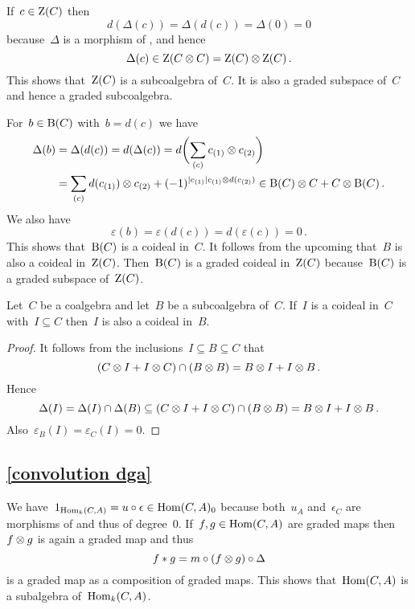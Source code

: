 \documentclass[a4paper,10pt,headings=standardclasses]{scrartcl}
\begin{document}
If~$c \in \operatorname{Z}(C)$ then
\[
  d(\Delta(c))
  =
  \Delta(d(c))
  =
  \Delta(0)
  =
  0
\]
because~$\Delta$ is a morphism of {\dgvs}, and hence
\[
  \Delta(c)
  \in
  \operatorname{Z}(C \otimes C)
  =
  \operatorname{Z}(C) \otimes \operatorname{Z}(C) \,.
\]
This shows that~$\operatorname{Z}(C)$ is a subcoalgebra of~$C$.
It is also a graded subspace of~$C$ and hence a graded subcoalgebra.

For~$b \in \operatorname{B}(C)$ with~$b = d(c)$ we have
\begin{align*}
  \Delta(b)
  &=
  \Delta(d(c))
  =
  d(\Delta(c))
  =
  d\biggl( \sum_{(c)} c_{(1)} \otimes c_{(2)} \biggr)
  \\
  &=
  \sum_{(c)}
  d(c_{(1)}) \otimes c_{(2)}
  +
  (-1)^{\lvert c_{(1)}\rvert c_{(1)} \otimes d(c_{(2)})}
  \in
  \operatorname{B}(C) \otimes C + C \otimes \operatorname{B}(C) \,.
\end{align*}
We also have
\[
  \varepsilon(b)
  =
  \varepsilon(d(c))
  =
  d(\varepsilon(c))
  =
  0 \,.
\]
This shows that~$\operatorname{B}(C)$ is a coideal in~$C$.
It follows from the upcoming  that~$B$ is also a coideal in~$\operatorname{Z}(C)$.
Then~$\operatorname{B}(C)$ is a graded coideal in~$\operatorname{Z}(C)$ because~$\operatorname{B}(C)$ is a graded subspace of~$\operatorname{Z}(C)$.

\begin{lemma}
  \label{restriction of coideals}
  Let~$C$ be a coalgebra and let~$B$ be a subcoalgebra of~$C$.
  If~$I$ is a coideal in~$C$ with~$I \subseteq C$ then~$I$ is also a coideal in~$B$.
\end{lemma}

\begin{proof}
  It follows from the inclusions~$I \subseteq B \subseteq C$ that
  \[
    (C \otimes I + I \otimes C) \cap (B \otimes B)
    =
    B \otimes I + I \otimes B \,.
  \]
  Hence
  \[
    \Delta(I)
    =
    \Delta(I) \cap \Delta(B)
    \subseteq
    (C \otimes I + I \otimes C) \cap (B \otimes B)
    =
    B \otimes I + I \otimes B \,.
  \]
  Also~$\varepsilon_B(I) = \varepsilon_C(I) = 0$.
\end{proof}








\subsection{\cref{convolution dga}}
\label{convolution dga proof}

We have~$1_{\operatorname{Hom}_k(C,A)} = u \circ \epsilon \in \operatorname{Hom}(C,A)_0$ because both~$u_A$ and~$\epsilon_C$ are morphisms of {\dgvs} and thus of degree~$0$.
If~$f, g \in \operatorname{Hom}(C,A)$ are graded maps then~$f \otimes g$ is again a graded map and thus
\[
  f * g
  =
  m \circ (f \otimes g) \circ \Delta
\]
is a graded map as a composition of graded maps.
This shows that~$\operatorname{Hom}(C,A)$ is a subalgebra of~$\operatorname{Hom}_k(C,A)$.
\end{document}
